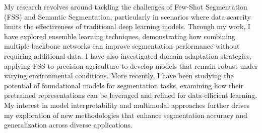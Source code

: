 

\begin{cvparagraph}
My research revolves around tackling the challenges of Few-Shot Segmentation (FSS) and Semantic Segmentation, particularly in scenarios where data scarcity limits the effectiveness of traditional deep learning models. Through my work, I have explored ensemble learning techniques, demonstrating how combining multiple backbone networks can improve segmentation performance without requiring additional data. I have also investigated domain adaptation strategies, applying FSS to precision agriculture to develop models that remain robust under varying environmental conditions. More recently, I have been studying the potential of foundational models for segmentation tasks, examining how their pretrained representations can be leveraged and refined for data-efficient learning. My interest in model interpretability and multimodal approaches further drives my exploration of new methodologies that enhance segmentation accuracy and generalization across diverse applications.
\end{cvparagraph}